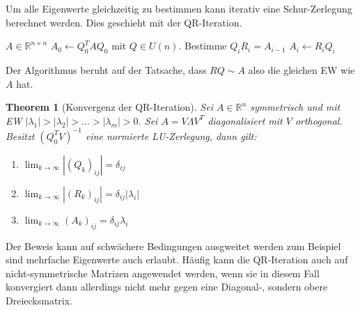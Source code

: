 \documentclass[10pt,a4paper]{article}
\newtheorem{theorem}{Theorem}
\begin{document}
	Um alle Eigenwerte gleichzeitig zu bestimmen kann iterativ eine Schur-Zerlegung berechnet werden. Dies geschieht mit der QR-Iteration.
	\begin{algorithm}[H]
		\caption{QR-Iteration ohne Shift}
		\begin{algorithmic}
			\Require $A\in \mathbb{R}^{n \times n}$
			\State $A_0 \leftarrow Q_0^TAQ_0$ mit $Q\in U(n)$.
			\State Bestimme $Q_iR_i = A_{i-1}$
			\State $A_{i} \leftarrow R_iQ_i$
			\EndFor
		\end{algorithmic}
	\end{algorithm}
	Der Algorithmus beruht auf der Tatsache, dass $RQ \sim A$ also die gleichen EW wie $A$ hat.
	\begin{theorem}[Konvergenz der QR-Iteration]
		Sei $A\in \mathbb{R}^n$ symmetrisch und mit EW $|\lambda_1|> |\lambda_2| > ... > |\lambda_m| > 0$. Sei $A = V\Lambda V^T$ diagonalisiert mit $V$ orthogonal. Besitzt $(Q_0^TV)^{-1}$ eine normierte LU-Zerlegung, dann gilt:
		\begin{enumerate}
			\item $\lim_{k\to \infty} |(Q_k)_{ij}| = \delta_{ij}$
			\item $\lim_{k\to \infty} |(R_k)_{ij}| = \delta_{ij}|\lambda_i|$
			\item $\lim_{k\to \infty} (A_k)_{ij} = \delta_{ij}\lambda_i$
		\end{enumerate}
	\end{theorem}
	Der Beweis kann auf schwächere Bedingungen ausgweitet werden zum Beispiel sind mehrfache Eigenwerte auch erlaubt. Häufig kann die QR-Iteration auch auf nicht-symmetrische Matrizen angewendet werden, wenn sie in diesem Fall konvergiert dann allerdings nicht mehr gegen eine Diagonal-, sondern obere Dreiecksmatrix. 
\end{document}
